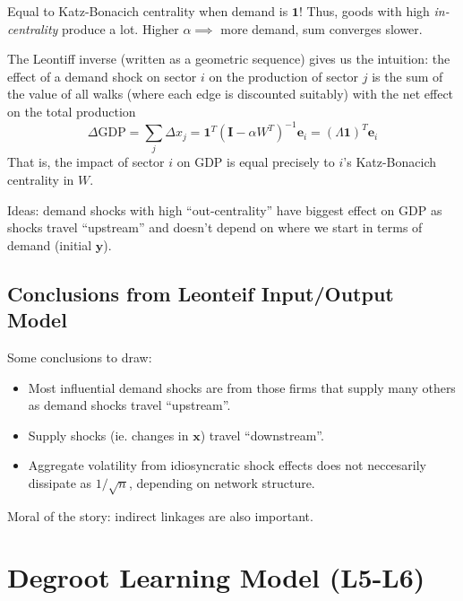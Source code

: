 \documentclass[9pt]{article}
\begin{document}
\begin{multicols}{2}
Equal to Katz-Bonacich centrality when demand is $\mathbf{1}$! 
Thus, goods with high \textit{in-centrality} produce a lot. Higher
$\alpha \implies $ more demand, sum converges slower.

The Leontiff inverse (written as a geometric sequence) gives us
the intuition: the effect of a demand shock on sector $i$ on the
production of sector $j$ is the sum of the value of all walks 
(where each edge is discounted suitably) with the net
effect on the total production 
$$\Delta\text{GDP} = \sum_{j}{\Delta x_j} = \mathbf{1}^{T}(\mathbf{I}-\alpha W^{T})^{-1}\mathbf{e}_i=(\Lambda \mathbf{1})^{T}\mathbf{e}_i$$
That is, the impact of sector $i$ on GDP is equal precisely to $i$'s
Katz-Bonacich centrality in $W$.

Ideas: demand shocks with high ``out-centrality'' have biggest effect on GDP as shocks travel ``upstream'' and doesn't depend on
where we start in terms of demand (initial $\mathbf{y}$).

\subsection{Conclusions from Leonteif Input/Output Model}

Some conclusions to draw:
\begin{itemize}
    \item Most influential demand shocks are from those firms that
    supply many others as demand shocks travel ``upstream''.
    \item Supply shocks (ie. changes in $\mathbf{x}$) travel ``downstream''. 
    \item Aggregate volatility from idiosyncratic shock effects 
    does not neccesarily dissipate as $1/\sqrt{n}$, depending on
    network structure.
\end{itemize}

Moral of the story: indirect linkages are also important. 

\section{Degroot Learning Model (L5-L6)}


\end{multicols}
\end{document}
